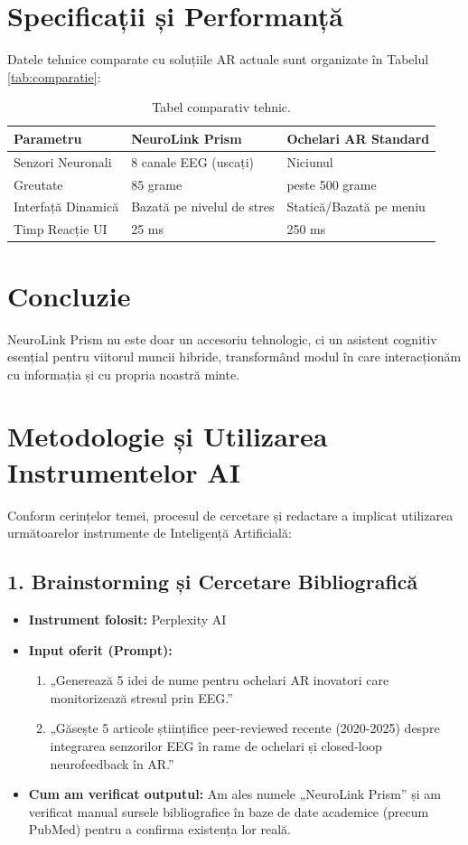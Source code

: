 \documentclass[12pt, a4paper]{article}
\begin{document}
\section{Specificații și Performanță}
Datele tehnice comparate cu soluțiile AR actuale sunt organizate în Tabelul \ref{tab:comparatie}:

\begin{table}[h]
\centering
\begin{tabular}{|m{4cm}|m{4cm}|m{4cm}|}
\hline
\textbf{Parametru} & \textbf{NeuroLink Prism} & \textbf{Ochelari AR Standard} \\ \hline
Senzori Neuronali & 8 canale EEG (uscați) & Niciunul \\ \hline
Greutate & 85 grame & peste 500 grame \\ \hline
Interfață Dinamică & Bazată pe nivelul de stres & Statică/Bazată pe meniu \\ \hline
Timp Reacție UI & 25 ms & 250 ms \\ \hline
\end{tabular}
\caption{Tabel comparativ tehnic.}
\end{table}

\section{Concluzie}
NeuroLink Prism nu este doar un accesoriu tehnologic, ci un asistent cognitiv esențial pentru viitorul muncii hibride, transformând modul în care interacționăm cu informația și cu propria noastră minte.

\newpage
\section{Metodologie și Utilizarea Instrumentelor AI}
Conform cerințelor temei, procesul de cercetare și redactare a implicat utilizarea următoarelor instrumente de Inteligență Artificială:

\subsection{1. Brainstorming și Cercetare Bibliografică}
\begin{itemize}
    \item \textbf{Instrument folosit:} Perplexity AI
    \item \textbf{Input oferit (Prompt):} 
    \begin{enumerate}
        \item „Generează 5 idei de nume pentru ochelari AR inovatori care monitorizează stresul prin EEG.”
        \item „Găsește 5 articole științifice peer-reviewed recente (2020-2025) despre integrarea senzorilor EEG în rame de ochelari și closed-loop neurofeedback în AR.”
    \end{enumerate}
    \item \textbf{Cum am verificat outputul:} Am ales numele „NeuroLink Prism” și am verificat manual sursele bibliografice în baze de date academice (precum PubMed) pentru a confirma existența lor reală.
\end{itemize}
\end{document}
